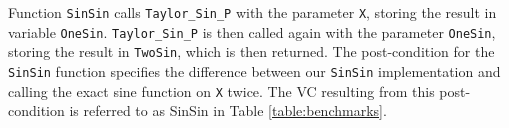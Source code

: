 \documentclass[runningheads]{llncs}
\begin{document}







Function \lstinline{SinSin} calls \lstinline{Taylor_Sin_P} with the parameter \lstinline{X}, storing the result in variable \lstinline{OneSin}.
\lstinline{Taylor_Sin_P} is then called again with the parameter \lstinline{OneSin}, storing the result in \lstinline{TwoSin}, which is then returned.
The post-condition for the \lstinline{SinSin} function specifies the difference between our \lstinline{SinSin} implementation and calling the exact sine function on \lstinline{X} twice.
The VC resulting from this post-condition is referred to as SinSin in Table \ref{table:benchmarks}.


\end{document}
